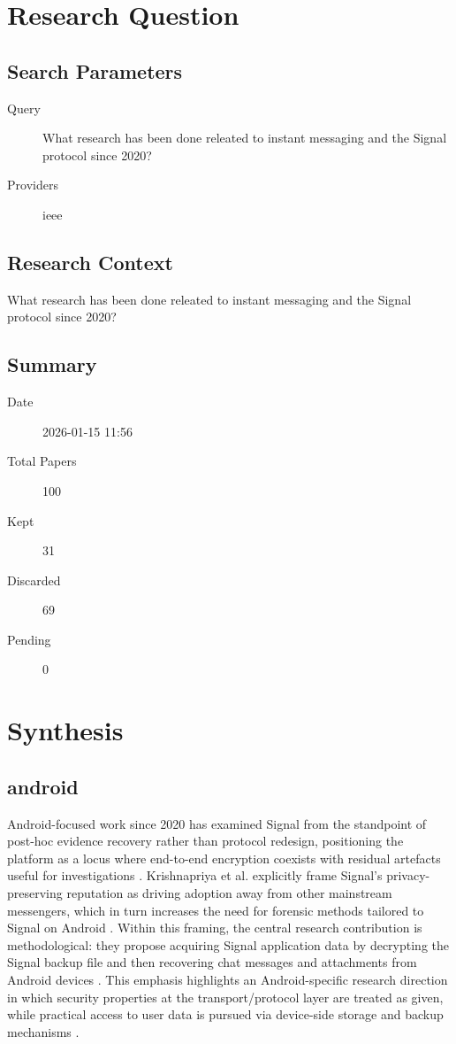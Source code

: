 \section{Research Question}

\subsection{Search Parameters}

\begin{description}
\item[Query] What research has been done releated to instant messaging and the Signal protocol since 2020?
\item[Providers] ieee
\end{description}

\subsection{Research Context}
What research has been done releated to instant messaging and the Signal
protocol since 2020?

\subsection{Summary}

\begin{description}
\item[Date] 2026-01-15 11:56
\item[Total Papers] 100
\item[Kept] 31
\item[Discarded] 69
\item[Pending] 0
\end{description}


\section{Synthesis}

\subsection{android}
Android-focused work since 2020 has examined Signal from the standpoint of post-hoc evidence recovery rather than protocol redesign, positioning the platform as a locus where end-to-end encryption coexists with residual artefacts useful for investigations \cite{krishnapriya2021}. Krishnapriya et al. explicitly frame Signal’s privacy-preserving reputation as driving adoption away from other mainstream messengers, which in turn increases the need for forensic methods tailored to Signal on Android \cite{krishnapriya2021}. Within this framing, the central research contribution is methodological: they propose acquiring Signal application data by decrypting the Signal backup file and then recovering chat messages and attachments from Android devices \cite{krishnapriya2021}. This emphasis highlights an Android-specific research direction in which security properties at the transport/protocol layer are treated as given, while practical access to user data is pursued via device-side storage and backup mechanisms \cite{krishnapriya2021}.

